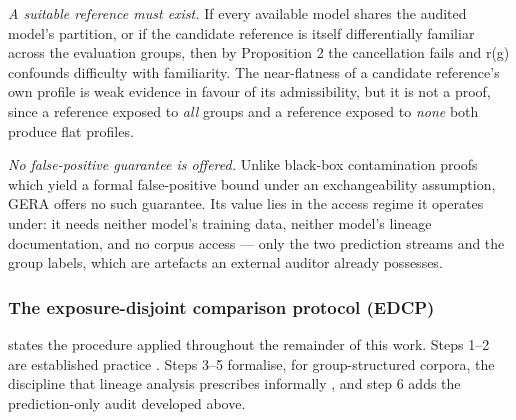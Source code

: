 \emph{A suitable reference must exist.} If every available model shares the audited model's partition, or if the candidate reference is itself differentially familiar across the evaluation groups, then by Proposition 2 the cancellation fails and r(g) confounds difficulty with familiarity. The near-flatness of a candidate reference's own profile is weak evidence in favour of its admissibility, but it is not a proof, since a reference exposed to \emph{all} groups and a reference exposed to \emph{none} both produce flat profiles.

\emph{No false-positive guarantee is offered.} Unlike black-box contamination proofs  which yield a formal false-positive bound under an exchangeability assumption, GERA offers no such guarantee. Its value lies in the access regime it operates under: it needs neither model's training data, neither model's lineage documentation, and no corpus access --- only the two prediction streams and the group labels, which are artefacts an external auditor already possesses.

\subsubsection{The exposure-disjoint comparison protocol (EDCP)}

 states the procedure applied throughout the remainder of this work. Steps 1--2 are established practice . Steps 3--5 formalise, for group-structured corpora, the discipline that lineage analysis prescribes informally , and step 6 adds the prediction-only audit developed above.


